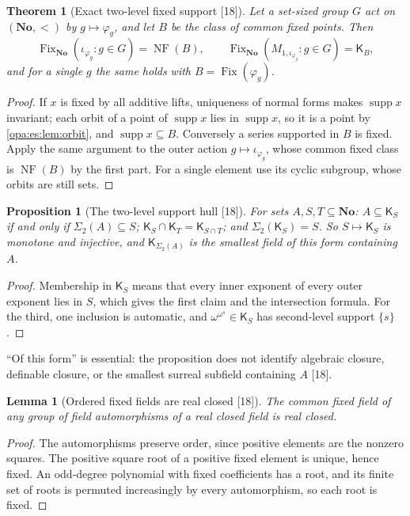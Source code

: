 \documentclass[11pt,oneside]{article}
\numberwithin{equation}{section}
\newtheorem{theorem}{Theorem}[section]
\newtheorem{proposition}[proposition]{Proposition}
\newtheorem{lemma}[lemma]{Lemma}
\theoremstyle{definition}
\theoremstyle{remark}
\newcommand{\No}{\mathbf{No}}
\newcommand{\supp}{\operatorname{supp}}
\newcommand{\Fix}{\operatorname{Fix}}
\newcommand{\src}[1]{\textup{\textsf{\small[#1]}}}
\newcommand{\NF}{\operatorname{NF}}
\begin{document}
\begin{theorem}[Exact two-level fixed support \src{18}]\label{opa:es:thm:fixedsupport}
Let a set-sized group $G$ act on $(\No,<)$ by $g\mapsto\varphi_g$, and let $B$ be the class of common fixed points. Then
\begin{equation}\label{opa:es:eq:fixedsupport}
 \Fix_{\No}(\iota_{\varphi_g}:g\in G)=\NF(B),\qquad \Fix_{\No}(M_{1,\iota_{\varphi_g}}:g\in G)=\mathsf K_B,
\end{equation}
and for a single $g$ the same holds with $B=\Fix(\varphi_g)$.
\end{theorem}
\begin{proof}
If $x$ is fixed by all additive lifts, uniqueness of normal forms makes $\supp x$ invariant; each orbit of a point of $\supp x$ lies in
$\supp x$, so it is a point by \cref{opa:es:lem:orbit}, and $\supp x\subseteq B$. Conversely a series supported in $B$ is fixed. Apply the
same argument to the outer action $g\mapsto\iota_{\varphi_g}$, whose common fixed class is $\NF(B)$ by the first part. For a single element
use its cyclic subgroup, whose orbits are still sets.
\end{proof}

\begin{proposition}[The two-level support hull \src{18}]\label{opa:es:prop:hulls}
For sets $A,S,T\subseteq\No$: $A\subseteq\mathsf K_S$ if and only if $\Sigma_2(A)\subseteq S$; $\mathsf K_S\cap\mathsf K_T=\mathsf K_{S\cap T}$; and
$\Sigma_2(\mathsf K_S)=S$. So $S\mapsto\mathsf K_S$ is monotone and injective, and $\mathsf K_{\Sigma_2(A)}$ is the smallest field \emph{of this
form} containing $A$.
\end{proposition}
\begin{proof}
Membership in $\mathsf K_S$ means that every inner exponent of every outer exponent lies in $S$, which gives the first claim and the
intersection formula. For the third, one inclusion is automatic, and $\omega^{\omega^s}\in\mathsf K_S$ has second-level support $\{s\}$.
\end{proof}

``Of this form'' is essential: the proposition does not identify algebraic closure, definable closure, or the smallest surreal subfield
containing $A$ \src{18}.

\begin{lemma}[Ordered fixed fields are real closed \src{18}]\label{opa:es:lem:realclosed}
The common fixed field of any group of field automorphisms of a real closed field is real closed.
\end{lemma}
\begin{proof}
The automorphisms preserve order, since positive elements are the nonzero squares. The positive square root of a positive fixed
element is unique, hence fixed. An odd-degree polynomial with fixed coefficients has a root, and its finite set of roots is permuted
increasingly by every automorphism, so each root is fixed.
\end{proof}
\end{document}
